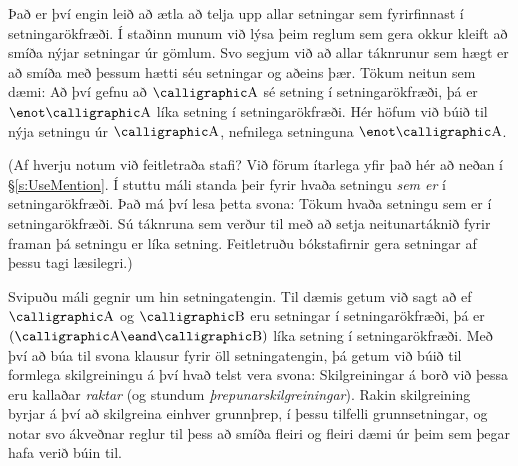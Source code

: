 Það er því engin leið að ætla að telja upp allar setningar sem fyrirfinnast í setningarökfræði. Í staðinn munum við lýsa þeim reglum sem gera okkur kleift að smíða nýjar setningar úr gömlum. Svo segjum við að allar táknrunur sem hægt er að smíða með þessum hætti séu setningar og aðeins þær. Tökum neitun sem dæmi: Að því gefnu að $\meta{A}$ sé setning í setningarökfræði, þá er $\enot \meta{A}$ líka setning í setningarökfræði. Hér höfum við búið til nýja setningu úr $\meta{A}$, nefnilega setninguna $\enot \meta{A}$.

(Af hverju notum við feitletraða stafi? Við förum ítarlega yfir það hér að neðan í \S\ref{s:UseMention}. Í stuttu máli standa þeir fyrir hvaða setningu \emph{sem er} í setningarökfræði. Það má því lesa þetta svona: Tökum hvaða setningu sem er í setningarökfræði. Sú táknruna sem verður til með að setja neitunartáknið fyrir framan þá setningu er líka setning. Feitletruðu bókstafirnir gera setningar af þessu tagi læsilegri.)

Svipuðu máli gegnir um hin setningatengin. Til dæmis getum við sagt að ef $\meta{A}$ og $\meta{B}$ eru setningar í setningarökfræði, þá er $(\meta{A} \eand \meta{B})$ líka setning í setningarökfræði. Með því að búa til svona klausur fyrir öll setningatengin, þá getum við búið til formlega skilgreiningu á því hvað telst vera  svona:
Skilgreiningar á borð við þessa eru kallaðar \emph{raktar} (og stundum \emph{þrepunarskilgreiningar}). Rakin skilgreining byrjar á því að skilgreina einhver grunnþrep, í þessu tilfelli grunnsetningar, og notar svo ákveðnar reglur til þess að smíða fleiri og fleiri dæmi úr þeim sem þegar hafa verið búin til. 

